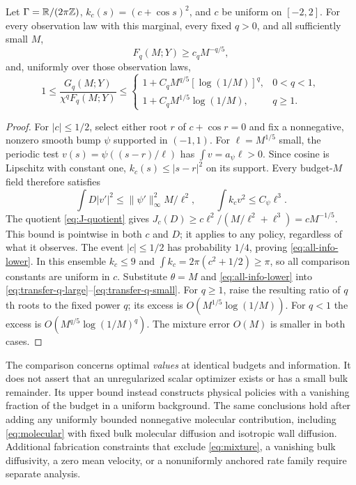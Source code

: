 \begin{corollary}
\label{cor:all-information}
Let $\Gamma=\mathbb R/(2\pi\mathbb Z)$, $k_c(s)=(c+\cos s)^2$, and
$c$ be uniform on $[-2,2]$. For every observation law with this marginal,
every fixed $q>0$, and all sufficiently small $M$,
\begin{equation}\label{eq:all-info-lower}
 F_q(M;Y)\ge c_qM^{-q/5},
\end{equation}
and, uniformly over those observation laws,
\begin{equation}\label{eq:all-info-ratio}
 1\le\frac{G_q(M;Y)}{\chi^qF_q(M;Y)}\le
 \begin{cases}
 1+C_qM^{q/5}[\log(1/M)]^q,&0<q<1,\\
 1+C_qM^{1/5}\log(1/M),&q\ge1.
 \end{cases}
\end{equation}
\end{corollary}
\begin{proof}
For $|c|\le1/2$, select either root $r$ of $c+\cos r=0$ and fix a
nonnegative, nonzero smooth bump $\psi$ supported in $(-1,1)$.
For $\ell=M^{1/5}$ small, the periodic test
$v(s)=\psi((s-r)/\ell)$ has
$\int v=a_\psi\ell>0$. Since cosine is Lipschitz with constant one,
$k_c(s)\le|s-r|^2$ on its support. Every budget-$M$ field therefore
satisfies
\[
 \int D|v'|^2\le\|\psi'\|_\infty^2M/\ell^2,
 \qquad \int k_cv^2\le C_\psi\ell^3.
\]
The quotient \eqref{eq:J-quotient} gives
$J_c(D)\ge c\ell^2/(M/\ell^2+\ell^3)=cM^{-1/5}$.
This bound is pointwise in both $c$ and $D$; it applies to any policy,
regardless of what it observes. The event $|c|\le1/2$ has probability
$1/4$, proving \eqref{eq:all-info-lower}. In this ensemble $k_c\le9$
and $\int k_c=2\pi(c^2+1/2)\ge\pi$, so all comparison constants
are uniform in $c$. Substitute $\theta=M$ and
\eqref{eq:all-info-lower} into
\eqref{eq:transfer-q-large}--\eqref{eq:transfer-q-small}.
For $q\ge1$, raise the resulting ratio of $q$th roots to the fixed
power $q$; its excess is $O(M^{1/5}\log(1/M))$.
For $q<1$ the excess is $O(M^{q/5}\log(1/M)^q)$.
The mixture error $O(M)$ is smaller in both cases.
\end{proof}

The comparison concerns optimal \emph{values} at identical budgets and
information. It does not assert that an unregularized scalar optimizer
exists or has a small bulk remainder. Its upper bound instead constructs
physical policies with a vanishing fraction of the budget in a uniform
background. The same conclusions hold after adding any uniformly bounded
nonnegative molecular contribution, including \eqref{eq:molecular} with
fixed bulk molecular diffusion and isotropic wall diffusion. Additional
fabrication constraints that exclude \eqref{eq:mixture}, a vanishing
bulk diffusivity, a zero mean velocity, or a nonuniformly anchored rate
family require separate analysis.
